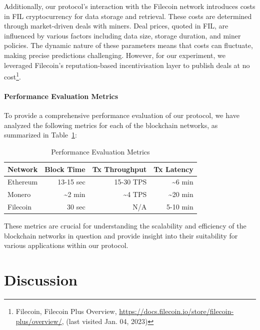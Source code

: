 \documentclass[pdftex,twocolumn,epjc3]{svjour3}
\begin{document}
Additionally, our protocol's interaction with the Filecoin network introduces costs in FIL cryptocurrency for data storage and retrieval. These costs are determined through market-driven deals with miners. Deal prices, quoted in FIL, are influenced by various factors including data size, storage duration, and miner policies. The dynamic nature of these parameters means that costs can fluctuate, making precise predictions challenging. However, for our experiment, we leveraged Filecoin's reputation-based incentivisation layer to publish deals at no cost\footnote{Filecoin, Filecoin Plus Overview, \url{https://docs.filecoin.io/store/filecoin-plus/overview/}, (last visited Jan. 04, 2023)}.

\paragraph{Performance Evaluation Metrics}

To provide a comprehensive performance evaluation of our protocol, we have analyzed the following metrics for each of the blockchain networks, as summarized in Table~\ref{table:performance}:

\begin{table}[h!]
\centering
\caption{Performance Evaluation Metrics}
\label{table:performance}
\begin{tabular}{lrrr}
\hline
\textbf{Network}     & \textbf{Block Time} & \textbf{Tx Throughput} & \textbf{Tx Latency} \\ \hline
Ethereum             & 13-15 sec       & 15-30 TPS                       & \textasciitilde{}6 min      \\
Monero               & \textasciitilde{}2 min & \textasciitilde{}4 TPS             & \textasciitilde{}20 min \\
Filecoin             & 30 sec & N/A\footnotemark{}            & 5-10 min  \\ 
\hline
\end{tabular}
\end{table}



These metrics are crucial for understanding the scalability and efficiency of the blockchain networks in question and provide insight into their suitability for various applications within our protocol.
\section{Discussion}
\label{sec:discussion}
\end{document}
